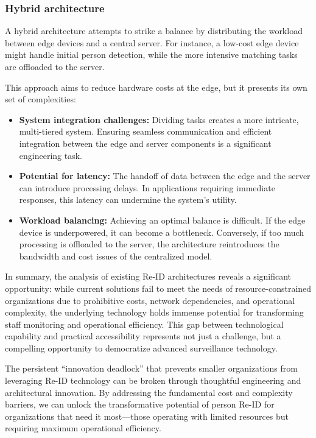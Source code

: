 \documentclass[../main.tex]{subfiles}
\begin{document}
\subsubsection{Hybrid architecture}
A hybrid architecture attempts to strike a balance by distributing the workload between edge devices and a central server. For instance, a low-cost edge device might handle initial person detection, while the more intensive matching tasks are offloaded to the server.

This approach aims to reduce hardware costs at the edge, but it presents its own set of complexities:
\begin{itemize}
    \item \textbf{System integration challenges:} Dividing tasks creates a more intricate, multi-tiered system. Ensuring seamless communication and efficient integration between the edge and server components is a significant engineering task.
    \item \textbf{Potential for latency:} The handoff of data between the edge and the server can introduce processing delays. In applications requiring immediate responses, this latency can undermine the system's utility.
    \item \textbf{Workload balancing:} Achieving an optimal balance is difficult. If the edge device is underpowered, it can become a bottleneck. Conversely, if too much processing is offloaded to the server, the architecture reintroduces the bandwidth and cost issues of the centralized model.
\end{itemize}

In summary, the analysis of existing Re-ID architectures reveals a significant opportunity: while current solutions fail to meet the needs of resource-constrained organizations due to prohibitive costs, network dependencies, and operational complexity, the underlying technology holds immense potential for transforming staff monitoring and operational efficiency. This gap between technological capability and practical accessibility represents not just a challenge, but a compelling opportunity to democratize advanced surveillance technology.

The persistent ``innovation deadlock'' that prevents smaller organizations from leveraging Re-ID technology can be broken through thoughtful engineering and architectural innovation. By addressing the fundamental cost and complexity barriers, we can unlock the transformative potential of person Re-ID for organizations that need it most—those operating with limited resources but requiring maximum operational efficiency.
\end{document}
